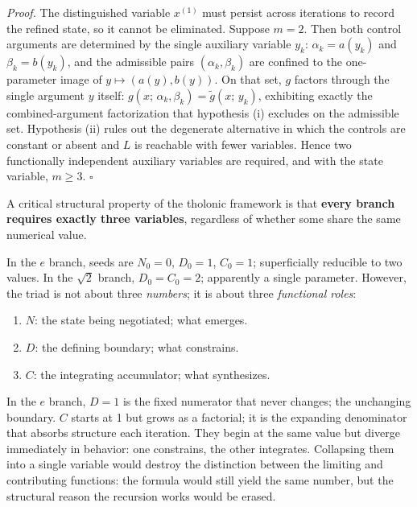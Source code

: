 \documentclass[
  11pt,
  letterpaper,
]{article}
\providecommand{\tightlist}{%
  \setlength{\itemsep}{0pt}\setlength{\parskip}{0pt}}
\begin{document}
\emph{Proof.} The distinguished variable \(x^{(1)}\) must persist across
iterations to record the refined state, so it cannot be eliminated.
Suppose \(m = 2\). Then both control arguments are determined by the
single auxiliary variable \(y_k\): \(\alpha_k = a(y_k)\) and
\(\beta_k = b(y_k)\), and the admissible pairs \((\alpha_k, \beta_k)\)
are confined to the one-parameter image of \(y \mapsto (a(y), b(y))\).
On that set, \(g\) factors through the single argument \(y\) itself:
\(g(x;\, \alpha_k, \beta_k) = \tilde{g}(x;\, y_k)\), exhibiting exactly
the combined-argument factorization that hypothesis (i) excludes on the
admissible set. Hypothesis (ii) rules out the degenerate alternative in
which the controls are constant or absent and \(L\) is reachable with
fewer variables. Hence two functionally independent auxiliary variables
are required, and with the state variable, \(m \geq 3\). \(\square\)

A critical structural property of the tholonic framework is that
\textbf{every branch requires exactly three variables}, regardless of
whether some share the same numerical value.

In the \(e\) branch, seeds are \(N_0 = 0\), \(D_0 = 1\), \(C_0 = 1\);
superficially reducible to two values. In the \(\sqrt{2}\) branch,
\(D_0 = C_0 = 2\); apparently a single parameter. However, the triad is
not about three \emph{numbers}; it is about three \emph{functional
roles}:

\begin{enumerate}
\def\labelenumi{\arabic{enumi}.}
\tightlist
\item
  \textbf{\(N\)}: the state being negotiated; what emerges.
\item
  \textbf{\(D\)}: the defining boundary; what constrains.
\item
  \textbf{\(C\)}: the integrating accumulator; what synthesizes.
\end{enumerate}

In the \(e\) branch, \(D = 1\) is the fixed numerator that never
changes; the unchanging boundary. \(C\) starts at 1 but grows as a
factorial; it is the expanding denominator that absorbs structure each
iteration. They begin at the same value but diverge immediately in
behavior: one constrains, the other integrates. Collapsing them into a
single variable would destroy the distinction between the limiting and
contributing functions: the formula would still yield the same number,
but the structural reason the recursion works would be erased.
\end{document}
